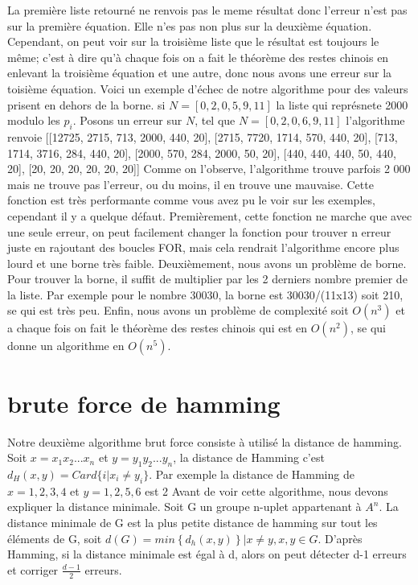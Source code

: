 \documentclass[a4paper, 11pt]{report}
\begin{document}
La première liste retourné ne renvois pas le meme résultat donc l'erreur n'est pas sur la première équation. Elle n'es pas non plus sur la deuxième équation.
Cependant, on peut voir sur la troisième liste que le résultat est toujours le même; c'est à dire qu'à chaque fois on a fait le théorème des restes chinois en enlevant la troisième équation et une autre, donc nous avons une erreur sur la toisième équation.
\newline
Voici un exemple d'échec de notre algorithme pour des valeurs prisent en dehors de la borne.
si $N=[0, 2, 0, 5, 9, 11]$ la liste qui représnete 2000 modulo les $p_i$. Posons un erreur sur $N$, tel que $N=[0, 2, 0, 6, 9, 11]$ l'algorithme renvoie 
[[12725, 2715, 713, 2000, 440, 20], [2715, 7720, 1714, 570, 440, 20], [713, 1714, 3716, 284, 440, 20], [2000, 570, 284, 2000, 50, 20], [440, 440, 440, 50, 440, 20], [20, 20, 20, 20, 20, 20]]
Comme on l'observe, l'algorithme trouve parfois 2 000 mais ne trouve pas l'erreur, ou du moins, il en trouve une mauvaise.
\newline
Cette fonction est très performante comme vous avez pu le voir sur les exemples, cependant il y a quelque défaut. Premièrement, cette fonction ne marche que avec une seule erreur,
on peut facilement changer la fonction pour trouver n erreur juste en rajoutant des boucles FOR, mais cela rendrait l'algorithme encore plus lourd et une borne très faible. Deuxièmement, nous avons un problème de borne. Pour trouver la borne,
il suffit de multiplier par les 2 derniers nombre premier de la liste. \newline
Par exemple pour le nombre 30030, la borne est 30030/(11x13) soit 210, se qui est très peu.\newline
Enfin, nous avons un problème de complexité soit $O(n^3)$ et a chaque fois on fait le théorème des restes chinois qui est en $O(n^2)$, se qui donne un algorithme en $O(n^5)$.




\newpage
\section{brute force de hamming}

Notre deuxième algorithme brut force consiste à utilisé la distance de hamming. Soit $x=x_1x_2 ... x_n$ et $y=y_1y_2 ... y_n$, la distance de Hamming c'est
$d_H(x,y)=Card\{  i\vert x_i \neq y_i \}$. Par exemple la distance de Hamming de $x={1,2,3,4}$ et $y={1,2,5,6}$ est 2\newline
Avant de voir cette algorithme, nous devons expliquer la distance minimale. Soit G un groupe n-uplet appartenant à $A^n$. La distance minimale de G est la plus petite distance de hamming sur tout les éléments de G, soit $d(G)=min{\left\{d_h(x,y)\right\} | x\neq y, x,y\in G}$.
D'après Hamming, si la distance minimale est égal à d, alors on peut détecter d-1 erreurs et corriger $\frac{d-1}{2}$ erreurs. \newline
\end{document}
